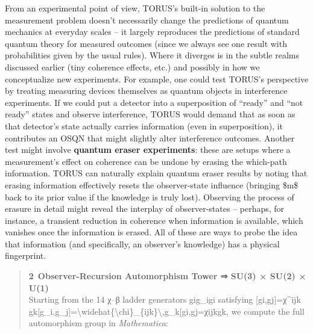 \documentclass[
]{article}
\begin{document}
{From an experimental point of view, TORUS's built-in solution to the
measurement problem doesn't necessarily change the predictions of
quantum mechanics at everyday scales -- it largely reproduces the
predictions of standard quantum theory for measured outcomes (since we
always see one result with probabilities given by the usual rules).
Where it diverges is in the subtle realms discussed earlier (tiny
coherence effects, etc.) and possibly in how we conceptualize new
experiments. For example, one could test TORUS's perspective by treating
measuring devices themselves as quantum objects in interference
experiments. If we could put a detector into a superposition of
``ready'' and ``not ready'' states and observe interference, TORUS would
demand that as soon as that detector's state actually carries
information (even in superposition), it contributes an OSQN that might
slightly alter interference outcomes. Another test might involve
\textbf{quantum eraser experiments}: these are setups where a
measurement's effect on coherence can be undone by erasing the
which-path information. TORUS can naturally explain quantum eraser
results by noting that erasing information effectively resets the
observer-state influence (bringing \$m\$ back to its prior value if the
knowledge is truly lost). Observing the process of erasure in detail
might reveal the interplay of observer-states -- perhaps, for instance,
a transient reduction in coherence when information is available, which
vanishes once the information is erased. All of these are ways to probe
the idea that information (and specifically, an observer's knowledge)
has a physical fingerprint.

\begin{quote}
\textbf{2 Observer-Recursion Automorphism Tower ⇒ SU(3) × SU(2) ×
U(1)}\\
Starting from the 14 χ--β ladder generators gig\_igi\hspace{0pt}
satisfying
{[}gi,gj{]}=χ\^{}ijk gk{[}g\_i,g\_j{]}=\textbackslash widehat\{\textbackslash chi\}\_\{ijk\}\textbackslash,g\_k{[}gi\hspace{0pt},gj\hspace{0pt}{]}=χ\hspace{0pt}ijk\hspace{0pt}gk\hspace{0pt},
we compute the full automorphism group in \emph{Mathematica}:


\end{quote}}
\end{document}
